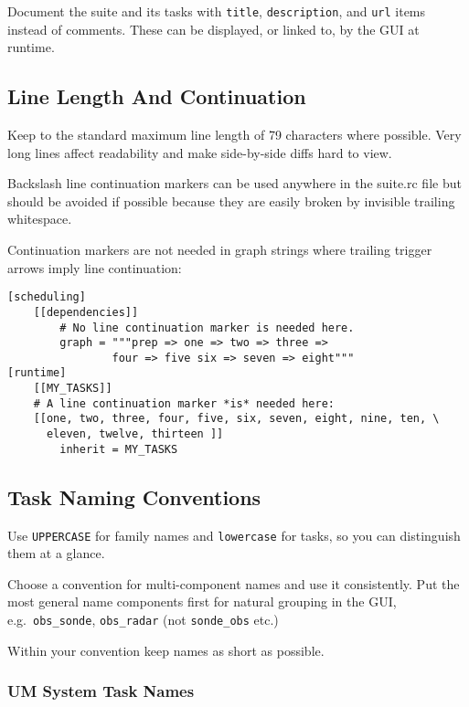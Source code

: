 Document the suite and its tasks with \lstinline=title=,
\lstinline=description=, and \lstinline=url= items instead of comments. These
can be displayed, or linked to, by the GUI at runtime.

\subsection{Line Length And Continuation}
\label{Line Length}

Keep to the standard maximum line length of 79 characters where possible. Very
long lines affect readability and make side-by-side diffs hard to view.

Backslash line continuation markers can be used anywhere in the suite.rc file
but should be avoided if possible because they are easily broken by invisible
trailing whitespace.

Continuation markers are not needed in graph strings where trailing
trigger arrows imply line continuation:

\lstset{language=suiterc}
\begin{lstlisting}
[scheduling]
    [[dependencies]]
        # No line continuation marker is needed here.
        graph = """prep => one => two => three =>
                four => five six => seven => eight"""
[runtime]
    [[MY_TASKS]]
    # A line continuation marker *is* needed here:
    [[one, two, three, four, five, six, seven, eight, nine, ten, \
      eleven, twelve, thirteen ]]
        inherit = MY_TASKS
\end{lstlisting}

\subsection{Task Naming Conventions}

Use \lstinline=UPPERCASE= for family names and \lstinline=lowercase=
for tasks, so you can distinguish them at a glance.

Choose a convention for multi-component names and use it consistently. Put the
most general name components first for natural grouping in the GUI, e.g.\
\lstinline=obs_sonde=, \lstinline=obs_radar= (not \lstinline=sonde_obs= etc.)

Within your convention keep names as short as possible.

\subsubsection{UM System Task Names}

